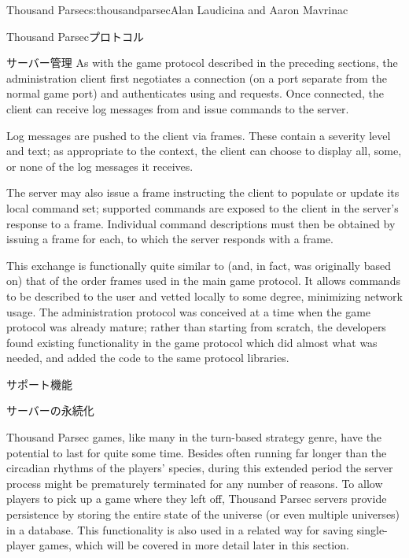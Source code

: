 \begin{aosachapter}{Thousand Parsec}{s:thousandparsec}{Alan Laudicina and Aaron Mavrinac}
\begin{aosasect1}{Thousand Parsecプロトコル}
\begin{aosasect2}{サーバー管理}
As with the game protocol described in the preceding sections, the
administration client first negotiates a connection (on a port
separate from the normal game port) and authenticates using
 and  requests. Once connected, the client
can receive log messages from and issue commands to the server.

Log messages are pushed to the client via 
frames. These contain a severity level and text; as appropriate to the
context, the client can choose to display all, some, or none of the
log messages it receives.

The server may also issue a  frame instructing
the client to populate or update its local command set; supported
commands are exposed to the client in the server's response to a
 frame. Individual command
descriptions must then be obtained by issuing a  frame for each, to which the server responds with a
 frame.

This exchange is functionally quite similar to (and, in fact, was
originally based on) that of the order frames used in the main game
protocol. It allows commands to be described to the user and vetted
locally to some degree, minimizing network usage. The administration
protocol was conceived at a time when the game protocol was already
mature; rather than starting from scratch, the developers found
existing functionality in the game protocol which did almost what was
needed, and added the code to the same protocol libraries.

\end{aosasect2}

\end{aosasect1}

\begin{aosasect1}{サポート機能}

\begin{aosasect2}{サーバーの永続化}

Thousand Parsec games, like many in the turn-based strategy genre,
have the potential to last for quite some time. Besides often running
far longer than the circadian rhythms of the players' species, during
this extended period the server process might be prematurely
terminated for any number of reasons. To allow players to pick up a
game where they left off, Thousand Parsec servers provide persistence
by storing the entire state of the universe (or even multiple
universes) in a database. This functionality is also used in a related
way for saving single-player games, which will be covered in more
detail later in this section.


\end{aosasect2}
\end{aosasect1}
\end{aosachapter}
